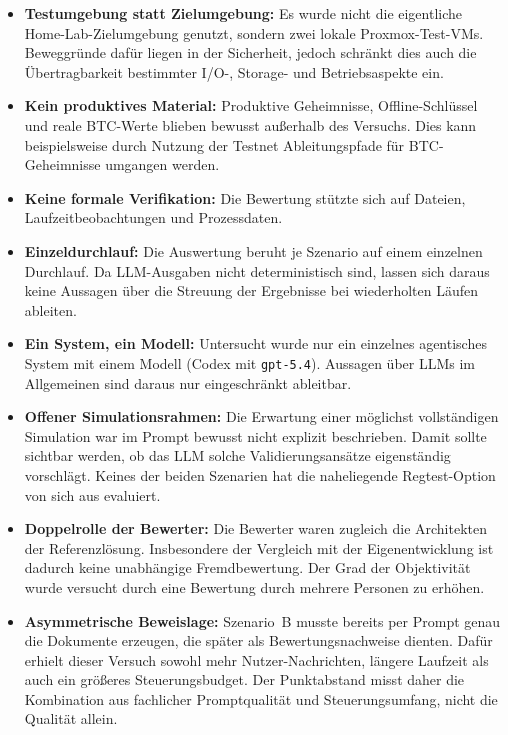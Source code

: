 \begin{itemize}
\item \textbf{Testumgebung statt Zielumgebung:} Es wurde nicht die eigentliche
Home-Lab-Zielumgebung genutzt, sondern zwei lokale Proxmox-Test-\acp{VM}. Beweggründe dafür liegen in der Sicherheit, jedoch schränkt dies auch die Übertragbarkeit bestimmter I/O-, Storage- und Betriebsaspekte ein.
\item \textbf{Kein produktives Material:} Produktive Geheimnisse, Offline-Schlüssel und reale \ac{BTC}-Werte blieben bewusst außerhalb des Versuchs. Dies kann beispielsweise durch Nutzung der Testnet Ableitungspfade für \ac{BTC}-Geheimnisse umgangen werden.
\item \textbf{Keine formale Verifikation:} Die Bewertung stützte sich auf Dateien, Laufzeitbeobachtungen und Prozessdaten.
\item \textbf{Einzeldurchlauf:} Die Auswertung beruht je Szenario auf einem einzelnen Durchlauf. Da \acs{LLM}-Ausgaben nicht deterministisch sind, lassen sich daraus keine Aussagen über die Streuung der Ergebnisse bei wiederholten Läufen ableiten.
\item \textbf{Ein System, ein Modell:} Untersucht wurde nur ein einzelnes agentisches System mit einem Modell (Codex mit \texttt{gpt-5.4}). Aussagen über \acp{LLM} im Allgemeinen sind daraus nur eingeschränkt ableitbar.
\item \textbf{Offener Simulationsrahmen:} Die Erwartung einer möglichst vollständigen Simulation war im Prompt bewusst nicht explizit beschrieben. Damit sollte sichtbar werden, ob das \ac{LLM} solche Validierungsansätze eigenständig vorschlägt. Keines der beiden Szenarien hat die naheliegende Regtest-Option von sich aus evaluiert.
\item \textbf{Doppelrolle der Bewerter:} Die Bewerter waren zugleich die Architekten der Referenzlösung. Insbesondere der Vergleich mit der Eigenentwicklung ist dadurch keine unabhängige Fremdbewertung. Der Grad der Objektivität wurde versucht durch eine Bewertung durch mehrere Personen zu erhöhen.
\item \textbf{Asymmetrische Beweislage:} Szenario~B musste bereits per Prompt genau die Dokumente erzeugen, die später als Bewertungsnachweise dienten. Dafür erhielt dieser Versuch sowohl mehr Nutzer-Nachrichten, längere Laufzeit als auch ein größeres Steuerungsbudget. Der Punktabstand misst daher die Kombination aus fachlicher Promptqualität und Steuerungsumfang, nicht die Qualität allein. \cite{openaiGPT54}
\end{itemize}

